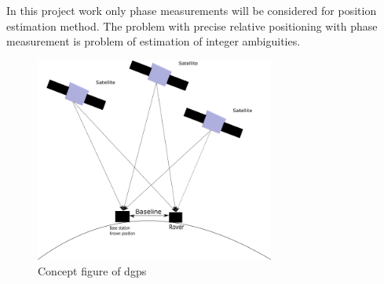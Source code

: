 In this project work only phase measurements will be considered for position estimation method.
The problem with precise relative positioning with phase measurement is problem of estimation of integer ambiguities.

\begin{figure}[H]
	\centering
		\includegraphics[width=0.7\textwidth]{figs/DGPS.png}
		\caption{Concept figure of \acrfull{dgps}}
		\label{figure:DGPS}
\end{figure}

